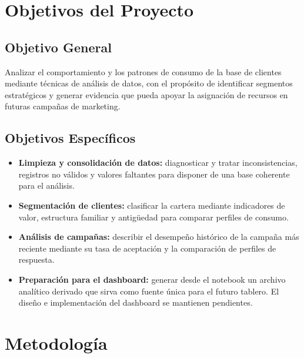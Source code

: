 \documentclass[12pt]{article}
\begin{document}
\section*{Objetivos del Proyecto}

\subsection*{Objetivo General}

Analizar el comportamiento y los patrones de consumo de la base de clientes mediante técnicas de análisis de datos, con el propósito de identificar segmentos estratégicos y generar evidencia que pueda apoyar la asignación de recursos en futuras campañas de marketing.

\subsection*{Objetivos Específicos}

\begin{itemize}[leftmargin=1.5em, itemsep=0.4em]
    \item \textbf{Limpieza y consolidación de datos:} diagnosticar y tratar inconsistencias, registros no válidos y valores faltantes para disponer de una base coherente para el análisis.
    \item \textbf{Segmentación de clientes:} clasificar la cartera mediante indicadores de valor, estructura familiar y antigüedad para comparar perfiles de consumo.
    \item \textbf{Análisis de campañas:} describir el desempeño histórico de la campaña más reciente mediante su tasa de aceptación y la comparación de perfiles de respuesta.
    \item \textbf{Preparación para el dashboard:} generar desde el notebook un archivo analítico derivado que sirva como fuente única para el futuro tablero. El diseño e implementación del dashboard se mantienen pendientes.
\end{itemize}

\newpage

\section*{Metodología}
\end{document}
